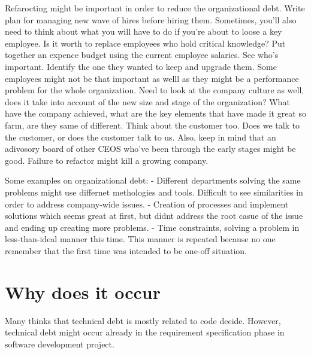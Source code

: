 Refarocting might be important in order to reduce the organizational debt. Write plan for managing new wave of hires before hiring them. Sometimes, you'll also need to think about what you will have to do if you're about to loose a key employee. Is it worth to replace employees who hold critical knowledge? Put together an expence budget using the current employee salaries. See who's important. Identify the one they wanted to keep and upgrade them. Some employees might not be that important as welll as they might be a performance problem for the whole organization. Need to look at the company culture as well, does it take into account of the new size and stage of the organization? What have the company achieved, what are the key elements that have made it great so farm, are they same of different. Think about the customer too. Does we talk to the customer, or does the customer talk to us. Also, keep in mind that an adivosory board of other CEOS who've been through the early stages might be good. Failure to refactor might kill a growing company. 

Some examples on organizational debt:
- Different departments solving the same problems might use differnet methologies and tools. Difficult to see similarities in order to address company-wide issues.
- Creation of processes and implement solutions which seems great at first, but didnt address the root casue of the issue and ending up creating more problems.
- Time constraints, solving a problem in less-than-ideal manner this time. This manner is repeated because no one remember that the first time was intended to be one-off situation.


\section{Why does it occur}
Many thinks that technical debt is mostly related to code decide. However, technical debt might occur already in the requirement specification phase in software development project. 

